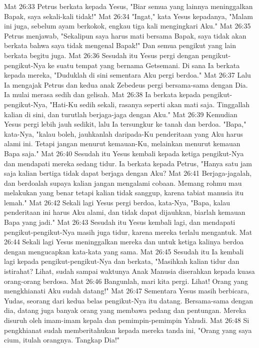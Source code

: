 Mat 26:33  Petrus berkata kepada Yesus, "Biar semua yang lainnya meninggalkan Bapak, saya sekali-kali tidak!"
Mat 26:34  "Ingat," kata Yesus kepadanya, "Malam ini juga, sebelum ayam berkokok, engkau tiga kali mengingkari Aku."
Mat 26:35  Petrus menjawab, "Sekalipun saya harus mati bersama Bapak, saya tidak akan berkata bahwa saya tidak mengenal Bapak!" Dan semua pengikut yang lain berkata begitu juga.
Mat 26:36  Sesudah itu Yesus pergi dengan pengikut-pengikut-Nya ke suatu tempat yang bernama Getsemani. Di sana Ia berkata kepada mereka, "Duduklah di sini sementara Aku pergi berdoa."
Mat 26:37  Lalu Ia mengajak Petrus dan kedua anak Zebedeus pergi bersama-sama dengan Dia. Ia mulai merasa sedih dan gelisah.
Mat 26:38  Ia berkata kepada pengikut-pengikut-Nya, "Hati-Ku sedih sekali, rasanya seperti akan mati saja. Tinggallah kalian di sini, dan turutlah berjaga-jaga dengan Aku."
Mat 26:39  Kemudian Yesus pergi lebih jauh sedikit, lalu Ia tersungkur ke tanah dan berdoa. "Bapa," kata-Nya, "kalau boleh, jauhkanlah daripada-Ku penderitaan yang Aku harus alami ini. Tetapi jangan menurut kemauan-Ku, melainkan menurut kemauan Bapa saja."
Mat 26:40  Sesudah itu Yesus kembali kepada ketiga pengikut-Nya dan mendapati mereka sedang tidur. Ia berkata kepada Petrus, "Hanya satu jam saja kalian bertiga tidak dapat berjaga dengan Aku?
Mat 26:41  Berjaga-jagalah, dan berdoalah supaya kalian jangan mengalami cobaan. Memang rohmu mau melakukan yang benar tetapi kalian tidak sanggup, karena tabiat manusia itu lemah."
Mat 26:42  Sekali lagi Yesus pergi berdoa, kata-Nya, "Bapa, kalau penderitaan ini harus Aku alami, dan tidak dapat dijauhkan, biarlah kemauan Bapa yang jadi."
Mat 26:43  Sesudah itu Yesus kembali lagi, dan mendapati pengikut-pengikut-Nya masih juga tidur, karena mereka terlalu mengantuk.
Mat 26:44  Sekali lagi Yesus meninggalkan mereka dan untuk ketiga kalinya berdoa dengan mengucapkan kata-kata yang sama.
Mat 26:45  Sesudah itu Ia kembali lagi kepada pengikut-pengikut-Nya dan berkata, "Masihkah kalian tidur dan istirahat? Lihat, sudah sampai waktunya Anak Manusia diserahkan kepada kuasa orang-orang berdosa.
Mat 26:46  Bangunlah, mari kita pergi. Lihat! Orang yang mengkhianati Aku sudah datang!"
Mat 26:47  Sementara Yesus masih berbicara, Yudas, seorang dari kedua belas pengikut-Nya itu datang. Bersama-sama dengan dia, datang juga banyak orang yang membawa pedang dan pentungan. Mereka disuruh oleh imam-imam kepala dan pemimpin-pemimpin Yahudi.
Mat 26:48  Si pengkhianat sudah memberitahukan kepada mereka tanda ini, "Orang yang saya cium, itulah orangnya. Tangkap Dia!"
